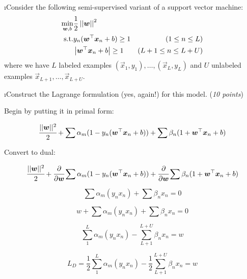 \documentclass[fleqn]{article}
\begin{document}

\bee
\i Consider the following semi-supervised variant of a support vector
machine:
\begin{eqnarray}
\min_{\vec w,b} & \frac 1 2 \norm{\vec w}^2 & \\
\text{s.t.} & y_n (\vec w\T\vec x_n + b) \geq 1 & (1\leq n\leq L)\\
& \ab{\vec w\T\vec x_n + b} \geq 1 & (L+1\leq n \leq L+U)
\end{eqnarray}
where we have $L$ labeled examples $(\vec x_1,y_1), \dots, (\vec x_L,
y_L)$ and $U$ unlabeled examples $\vec x_{L+1}, \dots, \vec x_{L+U}$.

\bee
\i Construct the Lagrange formulation (yes, again!) for this model.
(\emph{10 points})

\begin{solution}

Begin by putting it in primal form:

\begin{displaymath}
\cfrac{||\vec{w}||^2}{2} + \sum \alpha_m (1 - y_n (\vec{w}^\top \vec{x}_n + b)) + \sum \beta_n ( 1 + \vec{w}^\top \vec{x}_n + b)
\end{displaymath}

Convert to dual:

\begin{displaymath}
\cfrac{||\vec{w}||^2}{2} + \cfrac{\partial}{\partial \vec{w}} \sum \alpha_m (1 - y_n (\vec{w}^\top \vec{x}_n + b)) + \cfrac{\partial}{\partial \vec{w}}  \sum \beta_n ( 1 + \vec{w}^\top \vec{x}_n + b)
\end{displaymath}

\begin{displaymath}
\sum \alpha_m (y_n x_n) + \sum \beta_n x_n = 0
\end{displaymath}

\begin{displaymath}
w + \sum \alpha_m (y_n x_n) + \sum \beta_n x_n = 0
\end{displaymath}

\begin{displaymath}
\sum_1^L \alpha_m (y_n x_n) - \sum_{L+1}^{L+U} \beta_n x_n = w
\end{displaymath}

\begin{displaymath}
L_D = \frac{1}{2} \sum_1^L \alpha_m (y_n x_n) - \frac{1}{2} \sum_{L+1}^{L+U} \beta_n x_n = w
\end{displaymath}

\end{solution}
\end{document}
